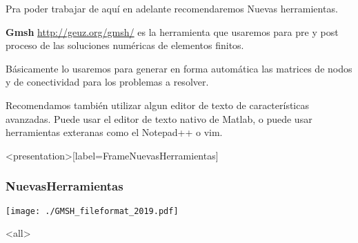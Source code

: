 
Pra poder trabajar de aquí en adelante recomendaremos 
Nuevas herramientas. 

\textbf{Gmsh} \url{http://geuz.org/gmsh/} es la herramienta
que usaremos para pre y post proceso de las soluciones numéricas
de elementos finitos.

Básicamente lo usaremos para generar en forma automática las 
matrices de nodos y de conectividad para los problemas a 
resolver. 

Recomendamos también utilizar algun editor de texto de 
características avanzadas. Puede usar el editor de texto 
nativo de Matlab, o puede usar herramientas exteranas como 
el Notepad++ o vim. 

\mode*
\begin{frame}<presentation>[label=FrameNuevasHerramientas]
  \frametitle{NuevasHerramientas}
  \texttt{[image: ./GMSH\_fileformat\_2019.pdf]}

\end{frame}

\mode<all>
